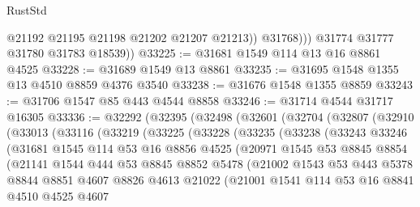 \begin{lexlean}{RustStd}
\begin{coremodule}
                  @21192
                  @21195
                  @21198
                  @21202
                  @21207
                  @21213))
              @31768)))
        @31774
        @31777
        @31780
        @31783
        @18539))
@33225 := @31681 @1549 @114 @13 @16 @8861 @4525
@33228 := @31689 @1549 @13 @8861
@33235 := @31695 @1548 @1355 @13 @4510 @8859 @4376 @3540
@33238 := @31676 @1548 @1355 @8859
@33243 := @31706 @1547 @85 @443 @4544 @8858
@33246 := @31714 @4544 @31717 @16305
@33336 := @32292
    (@32395
      (@32498
        (@32601
          (@32704
            (@32807
              (@32910
                (@33013
                  (@33116
                    (@33219
                      (@33225
                        (@33228
                          (@33235
                            (@33238
                              (@33243
                                @33246
                                (@31681
                                  @1545
                                  @114
                                  @53
                                  @16
                                  @8856
                                  @4525
                                  (@20971
                                    @1545
                                    @53
                                    @8845
                                    @8854
                                    (@21141
                                      @1544
                                      @444
                                      @53
                                      @8845
                                      @8852
                                      @5478
                                      (@21002
                                        @1543
                                        @53
                                        @443
                                        @5378
                                        @8844
                                        @8851
                                        @4607
                                        @8826
                                        @4613
                                        @21022
                                        (@21001
                                          @1541
                                          @114
                                          @53
                                          @16
                                          @8841
                                          @4510
                                          @4525
                                          @4607

\end{coremodule}
\end{lexlean}
